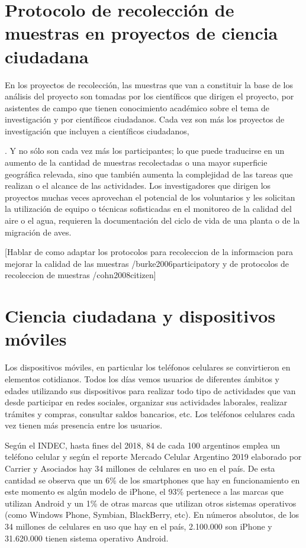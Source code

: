 \section{Protocolo de recolección de muestras en proyectos de ciencia ciudadana}

	 En los proyectos de recolección, las muestras que van a constituir la base de los análisis del proyecto son tomadas por los científicos que dirigen el proyecto, por asistentes de campo que tienen conocimiento académico sobre el tema de investigación y por científicos ciudadanos. Cada vez son más los proyectos de investigación que incluyen a científicos ciudadanos, 
	 
	 . Y no sólo son cada vez más los participantes; lo que puede traducirse en un aumento de la cantidad de muestras recolectadas o una mayor superficie geográfica relevada, sino que también aumenta la complejidad de las tareas que realizan o el alcance de las actividades. Los investigadores que dirigen los proyectos muchas veces aprovechan el potencial de los voluntarios y les solicitan la utilización de equipo o técnicas sofisticadas en el monitoreo de la calidad del aire o el agua, requieren la documentación del ciclo de vida de una planta o de la migración de aves.\cite{cohn2008citizen}
	 
	 
     [Hablar de como adaptar los protocolos para recoleccion de la informacion para mejorar la calidad de las muestras /burke2006participatory y de protocolos de recoleccion de muestras /cohn2008citizen]


	
\section{Ciencia ciudadana y dispositivos móviles}

	Los dispositivos móviles, en particular los teléfonos celulares se convirtieron en elementos cotidianos. Todos los días vemos usuarios de diferentes ámbitos y edades utilizando sus dispositivos para realizar todo tipo de actividades que van desde participar en redes sociales, organizar sus actividades laborales, realizar trámites y compras, consultar saldos bancarios, etc. Los teléfonos celulares cada vez tienen más presencia entre los usuarios. 
	
	Según el INDEC, hasta fines del 2018, 84 de cada 100 argentinos emplea un teléfono celular \cite{INDEC} y según el reporte Mercado Celular Argentino 2019 elaborado por Carrier y Asociados hay 34 millones de celulares en uso en el país. De esta cantidad se observa que un 6\% de los smartphones que hay en funcionamiento en este momento es algún modelo de iPhone, el 93\% pertenece a las marcas que utilizan Android y un 1\% de otras marcas que utilizan otros sistemas operativos (como Windows Phone, Symbian, BlackBerry, etc). En números absolutos, de los 34 millones de celulares en uso que hay en el país, 2.100.000 son iPhone y 31.620.000 tienen sistema operativo Android. \cite{carrier}	
		
